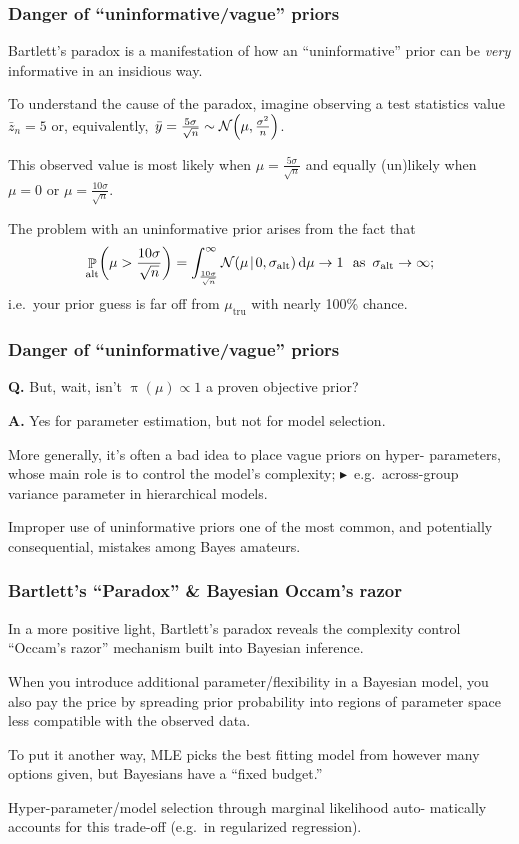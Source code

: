 \documentclass[18pt, handout]{beamer}
\newcommand{\defineTightSpacing}{%
	\setlength{\abovedisplayskip}{.25\baselineskip}%
	\setlength{\belowdisplayskip}{.25\baselineskip}%
}
\newcommand{\noteBullet}{\hspace*{.75em}\textcolor{themecolor}{$\blacktriangleright$}\ }
\renewcommand{\textsc}[1]{{\small \MakeUppercase{#1}}}
\newcommand{\given}{\mskip.7\thinmuskip | \mskip.7\thinmuskip}
\newcommand{\diff}{\operatorname{\mathrm{d}}\!{}}
\newcommand{\thinnerspace}{\mskip.5\thinmuskip}
\DeclareMathOperator{\probability}{\mathbb{P}}
\newcommand{\normalDist}{\operatorname{\mathcal{N}}}
\newcommand{\truthSub}{\mathrm{tru}}
\newcommand{\density}{\operatorname{\pi}}
\newcommand{\altSub}{\mathrm{alt}}
\begin{document}
\begin{frame}
\frametitle{Danger of ``uninformative/vague'' priors}
Bartlett's paradox is a manifestation of how an ``uninformative'' prior can be \textit{very} informative in an insidious way.

\smallskip
To understand the cause of the paradox, imagine observing a test statistics value $\bar{z}_n = 5$ or, equivalently, $\thinnerspace \bar{y} = \frac{5 \sigma}{\sqrt{n}} \sim \normalDist\!\left( \mu, \frac{\sigma^2}{n} \right)$.

\smallskip
This observed value is most likely when $\mu = \frac{5 \sigma}{\sqrt{n}}$ and equally (un)likely when $\mu = 0$ or $\mu = \frac{10 \sigma}{\sqrt{n}}$.

\smallskip
The problem with an uninformative prior arises from the fact that
\begin{equation*} \defineTightSpacing%
\probability_\altSub \!\left( \mu > \frac{10 \sigma}{\sqrt{n}} \right)
	= \int_{\frac{10 \sigma}{\sqrt{n}}}^{\infty} \normalDist\!\left( \mu \given 0, \sigma_\altSub \right) \diff \mu
	\to 1 \ \text{ as } \, \sigma_\altSub \to \infty;
\end{equation*}
i.e.\ your prior guess is  far off from $\mu_\truthSub$ with nearly 100\% chance.
\end{frame}


\begin{frame}
\frametitle{Danger of ``uninformative/vague'' priors}
\textbf{Q.} But, wait, isn't $\density(\mu) \propto 1$ a proven objective prior? 

\textbf{A.} Yes for parameter estimation, but not for model selection.

\smallskip
More generally, it's often a bad idea to place vague priors on hyper- parameters, whose main role is to control the model's complexity; 
\noteBullet e.g.\ across-group variance parameter in hierarchical models. 

\smallskip
Improper use of uninformative priors one of the most common, and potentially consequential, mistakes among Bayes amateurs.
\end{frame}


\begin{frame}
\frametitle{Bartlett's ``Paradox'' \& Bayesian Occam's razor}
In a more positive light, Bartlett's paradox reveals the complexity control ``Occam's razor'' mechanism built into Bayesian inference.

\smallskip
When you introduce additional parameter/flexibility in a Bayesian model, you also pay the price by spreading prior probability into regions of parameter space less compatible with the observed data.

\smallskip
To put it another way, \textsc{mle} picks the best fitting model from however many options given, but Bayesians have a ``fixed budget.''

\smallskip
Hyper-parameter/model selection through marginal likelihood auto- matically accounts for this trade-off (e.g.\ in regularized regression).
\end{frame}
\end{document}
